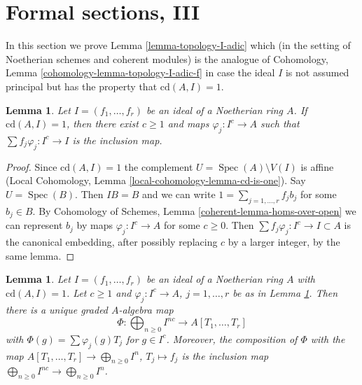 \documentclass[10pt,a4paper]{amsart}
\theoremstyle{plain}
\newtheorem{lemma}[subsection]{Lemma}
\theoremstyle{definition}
\theoremstyle{remark}
\numberwithin{equation}{subsection}
\def\Spec{\mathop{\mathrm{Spec}}}
\begin{document}
\section{Formal sections, III}
\label{section-formal-sections-cd-one}

\noindent
In this section we prove Lemma \ref{lemma-topology-I-adic}
which (in the setting of Noetherian schemes and coherent modules)
is the analogue of Cohomology, Lemma \ref{cohomology-lemma-topology-I-adic-f}
in case the ideal $I$ is not assumed principal but
has the property that $\text{cd}(A, I) = 1$.

\begin{lemma}
\label{lemma-cd-one}
Let $I = (f_1, \ldots, f_r)$ be an ideal of a Noetherian ring $A$.
If $\text{cd}(A, I) = 1$, then there exist $c \geq 1$ and maps
$\varphi_j : I^c \to A$ such that $\sum f_j \varphi_j : I^c \to I$
is the inclusion map.
\end{lemma}

\begin{proof}
Since $\text{cd}(A, I) = 1$ the complement $U = \Spec(A) \setminus V(I)$
is affine (Local Cohomology, Lemma \ref{local-cohomology-lemma-cd-is-one}).
Say $U = \Spec(B)$. Then $IB = B$
and we can write $1 = \sum_{j = 1, \ldots, r} f_j b_j$
for some $b_j \in B$. By
Cohomology of Schemes, Lemma \ref{coherent-lemma-homs-over-open}
we can represent $b_j$ by maps $\varphi_j : I^c \to A$
for some $c \geq 0$. Then $\sum f_j \varphi_j : I^c \to I \subset A$
is the canonical embedding, after possibly replacing $c$ by a larger
integer, by the same lemma.
\end{proof}

\begin{lemma}
\label{lemma-cd-one-extend}
Let $I = (f_1, \ldots, f_r)$ be an ideal of a Noetherian ring $A$
with $\text{cd}(A, I) = 1$. Let $c \geq 1$ and $\varphi_j : I^c \to A$,
$j = 1, \ldots, r$ be as in Lemma \ref{lemma-cd-one}.
Then there is a unique graded $A$-algebra map
$$
\Phi : \bigoplus\nolimits_{n \geq 0} I^{nc} \to A[T_1, \ldots, T_r]
$$
with $\Phi(g) = \sum \varphi_j(g) T_j$ for $g \in I^c$.
Moreover, the composition of $\Phi$ with the map
$A[T_1, \ldots, T_r] \to \bigoplus_{n \geq 0} I^n$,
$T_j \mapsto f_j$ is the inclusion map
$\bigoplus_{n \geq 0} I^{nc} \to \bigoplus_{n \geq 0} I^n$.
\end{lemma}
\end{document}
